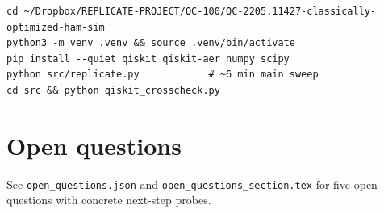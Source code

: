 \documentclass[11pt]{article}
\begin{document}
\begin{lstlisting}[basicstyle=\ttfamily\small,breaklines=true]
cd ~/Dropbox/REPLICATE-PROJECT/QC-100/QC-2205.11427-classically-optimized-ham-sim
python3 -m venv .venv && source .venv/bin/activate
pip install --quiet qiskit qiskit-aer numpy scipy
python src/replicate.py            # ~6 min main sweep
cd src && python qiskit_crosscheck.py
\end{lstlisting}

\section{Open questions}

See \texttt{open\_questions.json} and \texttt{open\_questions\_section.tex} for five open
questions with concrete next-step probes.
\end{document}
